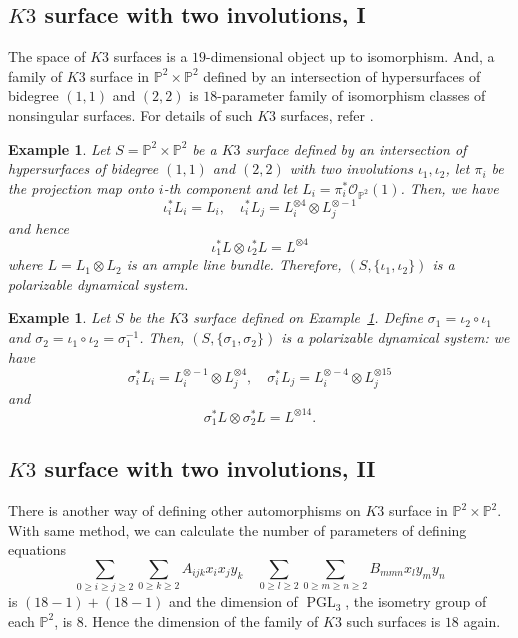 \documentclass[11pt,letterpaper]{amsart}
\newtheorem{ex}[thm]{Example}
\begin{document}
    \subsection{$K3$ surface with two involutions, I}
    The space of $K3$ surfaces is a $19$-dimensional object up to isomorphism. And, a family of $K3$ surface in ${\mathbb{P}}^2\times {\mathbb{P}}^2$ defined by an intersection of hypersurfaces of bidegree $(1,1)$ and $(2,2)$ is $18$-parameter family of isomorphism classes of nonsingular surfaces. For details of such $K3$ surfaces, refer \cite[\S 7.4]{S2}.

    \begin{ex}\label{K3I}
        Let $S ={\mathbb{P}}^2\times {\mathbb{P}}^2$ be a $K3$ surface defined by an intersection of hypersurfaces of bidegree $(1,1)$ and $(2,2)$ with two involutions $\iota_1, \iota_2$, let $\pi_i$ be the projection map onto $i$-th component and let $L_i = \pi_i^*{\mathcal{O}}_{{\mathbb{P}}^2}(1)$.
        Then, we have
        \[
        \iota_i^*L_i = L_i,  \quad \iota_i^*L_j = L_i^{\otimes 4} \otimes L_j^{\otimes-1}
        \]
        and hence
        \[
        \iota_1^*L \otimes \iota_2^*L = L^{\otimes 4}
        \]
        where $L =L_1 \otimes L_2$ is an ample line bundle. Therefore, $(S, \{ \iota_1, \iota_2 \})$ is a polarizable dynamical system.
    \end{ex}

    \begin{ex}\label{K3IB}
        Let $S$ be the $K3$ surface defined on Example~\ref{K3I}. Define $\sigma_1 = \iota_2 \circ \iota_1$ and $\sigma_2 = \iota_1 \circ \iota_2 = \sigma_1^{-1}$. Then,
        $(S, \{\sigma_1, \sigma_2\})$ is a polarizable dynamical system: we have
         \[
        \sigma_i^*L_i = L_i^{\otimes -1} \otimes L_j^{\otimes 4}, \quad  \sigma_i^*L_j = L_i^{\otimes -4} \otimes L_j^{\otimes 15}
        \]
        and
        \[
        \sigma_1^*L \otimes \sigma_2^*L = L^{\otimes 14}.
        \]
    \end{ex}

    \subsection{$K3$ surface with two involutions, II}

    There is another way of defining other automorphisms on $K3$ surface in ${\mathbb{P}}^2 \times {\mathbb{P}}^2$. With same method, we can calculate the
    number of parameters of defining equations
     \[
     \sum_{0\geq i \geq j \geq 2}\sum_{0\geq k \geq 2} A_{ijk}  x_{i} x_j y_k  \quad \sum_{0\geq l \geq 2}\sum_{0\geq m \geq n \geq 2}
     B_{mmn}  x_{l} y_m y_n
     \]
     is $(18-1)+(18-1)$ and the dimension of ${\operatorname{PGL}}_3$, the isometry group of each ${\mathbb{P}}^2$, is 8. Hence the dimension of the family of $K3$ such surfaces is $18$ again.
\end{document}

